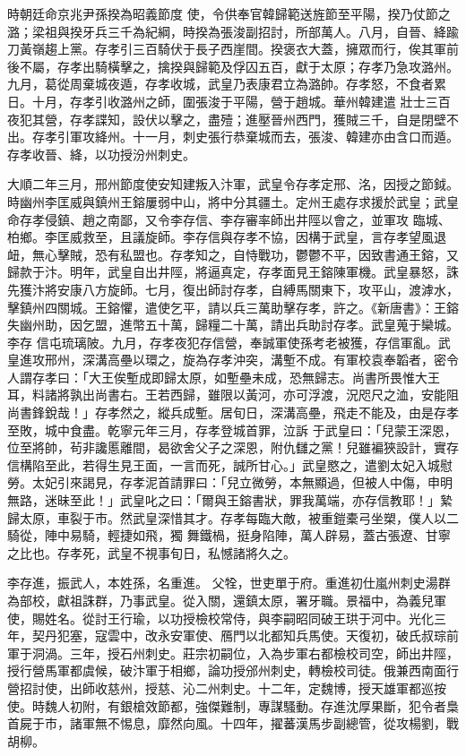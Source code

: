 \begin{pinyinscope}
 時朝廷命京兆尹孫揆為昭義節度
 使，令供奉官韓歸範送旌節至平陽，揆乃仗節之潞；梁祖與揆牙兵三千為紀綱，時揆為張浚副招討，所部萬人。八月，自晉、絳踰刀黃嶺趨上黨。存孝引三百騎伏于長子西崖間。揆褒衣大蓋，擁眾而行，俟其軍前後不屬，存孝出騎橫擊之，擒揆與歸範及俘囚五百，獻于太原；存孝乃急攻潞州。九月，葛從周棄城夜遁，存孝收城，武皇乃表康君立為潞帥。存孝怒，不食者累日。十月，存孝引收潞州之師，圍張浚于平陽，營于趙城。華州韓建遣
 壯士三百夜犯其營，存孝諜知，設伏以擊之，盡殪；進壓晉州西門，獲賊三千，自是閉壁不出。存孝引軍攻絳州。十一月，刺史張行恭棄城而去，張浚、韓建亦由含口而遁。存孝收晉、絳，以功授汾州刺史。



 大順二年三月，邢州節度使安知建叛入汴軍，武皇令存孝定邢、洺，因授之節鉞。時幽州李匡威與鎮州王鎔屢弱中山，將中分其疆土。定州王處存求援於武皇；武皇命存孝侵鎮、趙之南鄙，又令李存信、李存審率師出井陘以會之，並軍攻
 臨城、柏鄉。李匡威救至，且議旋師。李存信與存孝不協，因構于武皇，言存孝望風退衄，無心擊賊，恐有私盟也。存孝知之，自恃戰功，鬱鬱不平，因致書通王鎔，又歸款于汴。明年，武皇自出井陘，將逼真定，存孝面見王鎔陳軍機。武皇暴怒，誅先獲汴將安康八方旋師。七月，復出師討存孝，自縛馬關東下，攻平山，渡滹水，擊鎮州四關城。王鎔懼，遣使乞平，請以兵三萬助擊存孝，許之。《新唐書》：王鎔失幽州助，因乞盟，進幣五十萬，歸糧二十萬，請出兵助討存孝。武皇蒐于欒城。李存
 信屯琉璃陂。九月，存孝夜犯存信營，奉誠軍使孫考老被獲，存信軍亂。武皇進攻邢州，深溝高壘以環之，旋為存孝沖突，溝塹不成。有軍校袁奉韜者，密令人謂存孝曰：「大王俟塹成即歸太原，如塹壘未成，恐無歸志。尚書所畏惟大王耳，料諸將孰出尚書右。王若西歸，雖限以黃河，亦可浮渡，況咫尺之洫，安能阻尚書鋒銳哉！」存孝然之，縱兵成塹。居旬日，深溝高壘，飛走不能及，由是存孝至敗，城中食盡。乾寧元年三月，存孝登城首罪，泣訴
 于武皇曰：「兒蒙王深恩，位至將帥，茍非讒慝離間，曷欲舍父子之深恩，附仇讎之黨！兒雖褊狹設計，實存信構陷至此，若得生見王面，一言而死，誠所甘心。」武皇愍之，遣劉太妃入城慰勞。太妃引來謁見，存孝泥首請罪曰：「兒立微勞，本無顯過，但被人中傷，申明無路，迷昧至此！」武皇叱之曰：「爾與王鎔書狀，罪我萬端，亦存信教耶！」縶歸太原，車裂于市。然武皇深惜其才。存孝每臨大敵，被重鎧橐弓坐槊，僕人以二騎從，陣中易騎，輕捷如飛，獨
 舞鐵楇，挺身陷陣，萬人辟易，蓋古張遼、甘寧之比也。存孝死，武皇不視事旬日，私憾諸將久之。


李存進，振武人，本姓孫，名重進。
 父牷，世吏單于府。重進初仕嵐州刺史湯群為部校，獻祖誅群，乃事武皇。從入關，還鎮太原，署牙職。景福中，為義兒軍使，賜姓名。從討王行瑜，以功授檢校常侍，與李嗣昭同破王珙于河中。光化三年，契丹犯塞，寇雲中，改永安軍使、鴈門以北都知兵馬使。天復初，破氏叔琮前
 軍于洞渦。三年，授石州刺史。莊宗初嗣位，入為步軍右都檢校司空，師出井陘，授行營馬軍都虞候，破汴軍于相鄉，論功授邠州刺史，轉檢校司徒。俄兼西南面行營招討使，出師收慈州，授慈、沁二州刺史。十二年，定魏博，授天雄軍都巡按使。時魏人初附，有銀槍效節都，強傑難制，專謀騷動。存進沈厚果斷，犯令者梟首屍于市，諸軍無不惕息，靡然向風。十四年，擢蕃漢馬步副總管，從攻楊劉，戰胡柳。




\end{pinyinscope}
